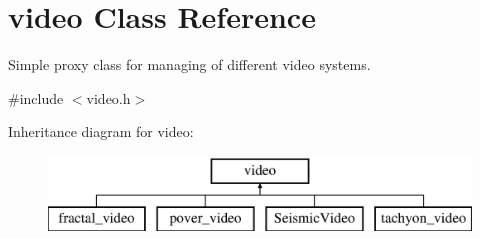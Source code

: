 \hypertarget{classvideo}{}\section{video Class Reference}
\label{classvideo}


Simple proxy class for managing of different video systems.  




{\ttfamily \#include $<$video.\+h$>$}

Inheritance diagram for video\+:\begin{figure}[H]
\begin{center}
\leavevmode
\includegraphics[height=2.000000cm]{classvideo}
\end{center}
\end{figure}
